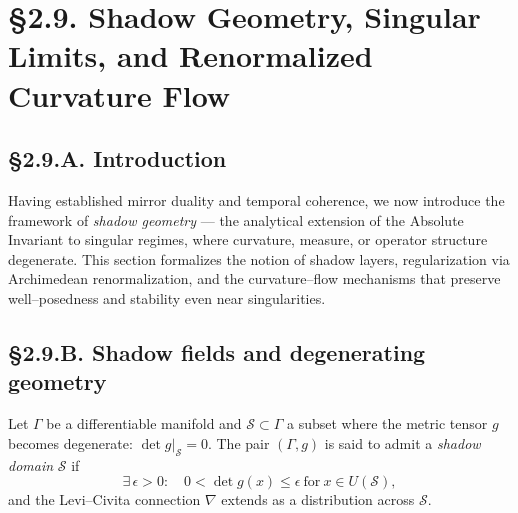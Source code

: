 
\section{§2.9. Shadow Geometry, Singular Limits, and Renormalized Curvature Flow}
\label{sec:2.9-shadow}

\subsection*{§2.9.A. Introduction}

Having established mirror duality and temporal coherence, we now introduce the framework of
\emph{shadow geometry} — the analytical extension of the Absolute Invariant to singular regimes,
where curvature, measure, or operator structure degenerate.
This section formalizes the notion of shadow layers, regularization via Archimedean renormalization,
and the curvature–flow mechanisms that preserve well–posedness and stability even near singularities.

\subsection*{§2.9.B. Shadow fields and degenerating geometry}

\begin{definition}
Let $\Gamma$ be a differentiable manifold and $\mathcal{S}\subset\Gamma$ a subset where the metric
tensor $g$ becomes degenerate: $\det g|_\mathcal{S}=0$.  
The pair $(\Gamma,g)$ is said to admit a \emph{shadow domain} $\mathcal{S}$ if
\[
\exists\, \epsilon>0:\quad 0<\det g(x)\le \epsilon\ \text{for}\ x\in U(\mathcal{S}),
\]
and the Levi–Civita connection $\nabla$ extends as a distribution across $\mathcal{S}$.
\]
\end{definition}


